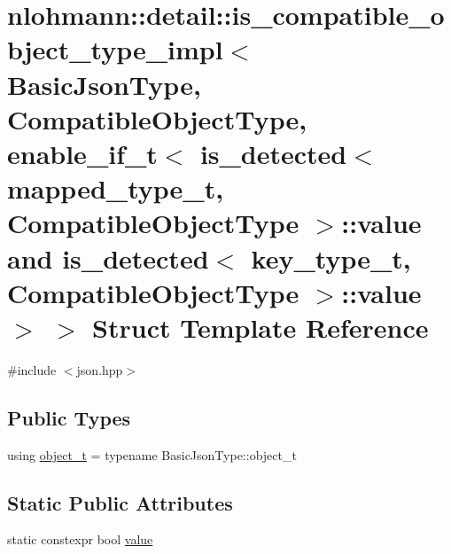 \hypertarget{structnlohmann_1_1detail_1_1is__compatible__object__type__impl_3_01_basic_json_type_00_01_compatfbe9a153c4ecce445c98bbdd2d65f605}{}\section{nlohmann\+::detail\+::is\+\_\+compatible\+\_\+object\+\_\+type\+\_\+impl$<$ Basic\+Json\+Type, Compatible\+Object\+Type, enable\+\_\+if\+\_\+t$<$ is\+\_\+detected$<$ mapped\+\_\+type\+\_\+t, Compatible\+Object\+Type $>$\+::value and is\+\_\+detected$<$ key\+\_\+type\+\_\+t, Compatible\+Object\+Type $>$\+::value $>$ $>$ Struct Template Reference}
\label{structnlohmann_1_1detail_1_1is__compatible__object__type__impl_3_01_basic_json_type_00_01_compatfbe9a153c4ecce445c98bbdd2d65f605}


{\ttfamily \#include $<$json.\+hpp$>$}

\subsection*{Public Types}
\begin{DoxyCompactItemize}
\item 
using \mbox{\hyperlink{structnlohmann_1_1detail_1_1is__compatible__object__type__impl_3_01_basic_json_type_00_01_compatfbe9a153c4ecce445c98bbdd2d65f605_a551e9ee372c1b24b632e6b668c231a62}{object\+\_\+t}} = typename Basic\+Json\+Type\+::object\+\_\+t
\end{DoxyCompactItemize}
\subsection*{Static Public Attributes}
\begin{DoxyCompactItemize}
\item 
static constexpr bool \mbox{\hyperlink{structnlohmann_1_1detail_1_1is__compatible__object__type__impl_3_01_basic_json_type_00_01_compatfbe9a153c4ecce445c98bbdd2d65f605_adc8188ae8d65e8175d961cd461a8ee43}{value}}
\end{DoxyCompactItemize}


